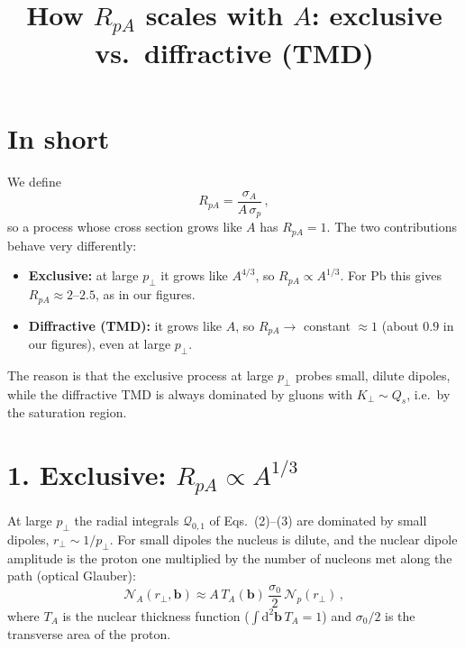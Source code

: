 \documentclass[12pt]{article}
\title{How $R_{pA}$ scales with $A$: exclusive vs.\ diffractive (TMD)}
\author{}
\date{}
\begin{document}
\maketitle

\section*{In short}

We define
\[
  R_{pA}=\frac{\sigma_A}{A\,\sigma_p}\,,
\]
so a process whose cross section grows like $A$ has $R_{pA}=1$. The two contributions behave very
differently:
\begin{itemize}
\item \textbf{Exclusive:} at large $p_\perp$ it grows like $A^{4/3}$, so $R_{pA}\propto A^{1/3}$. For Pb
  this gives $R_{pA}\approx2$--$2.5$, as in our figures.
\item \textbf{Diffractive (TMD):} it grows like $A$, so $R_{pA}\to$ constant $\approx1$ (about $0.9$ in our
  figures), even at large $p_\perp$.
\end{itemize}
The reason is that the exclusive process at large $p_\perp$ probes small, dilute dipoles, while the
diffractive TMD is always dominated by gluons with $K_\perp\sim Q_s$, i.e.\ by the saturation region.

\section*{1. Exclusive: $R_{pA}\propto A^{1/3}$}

At large $p_\perp$ the radial integrals $\mathcal{Q}_{0,1}$ of Eqs.~(2)--(3) are dominated by small dipoles,
$r_\perp\sim1/p_\perp$. For small dipoles the nucleus is dilute, and the nuclear dipole amplitude is
the proton one multiplied by the number of nucleons met along the path (optical Glauber):
\[
  \mathcal{N}_A(r_\perp,\mathbf{b})\approx A\,T_A(\mathbf{b})\,\frac{\sigma_0}{2}\,\mathcal{N}_p(r_\perp)\,,
\]
where $T_A$ is the nuclear thickness function ($\int\mathrm{d}^2\mathbf{b}\,T_A=1$) and $\sigma_0/2$ is the
transverse area of the proton.
\end{document}
